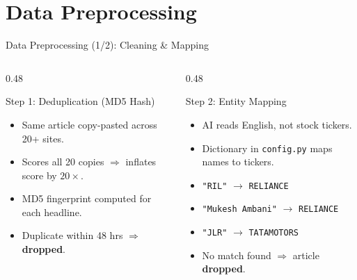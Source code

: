 \documentclass[aspectratio=169, 10pt]{beamer}
\begin{document}
\section{Data Preprocessing}
\begin{frame}{Data Preprocessing (1/2): Cleaning \& Mapping}
    \begin{columns}[T]
        \begin{column}{0.48\textwidth}
            \begin{block}{Step 1: Deduplication (MD5 Hash)}
                \begin{itemize}
                    \item Same article copy-pasted across 20+ sites.
                    \item Scores all 20 copies $\Rightarrow$ inflates score by $20\times$.
                    \item MD5 fingerprint computed for each headline.
                    \item Duplicate within 48 hrs $\Rightarrow$ \textbf{dropped}.
                \end{itemize}
            \end{block}
        \end{column}
        \begin{column}{0.48\textwidth}
            \begin{block}{Step 2: Entity Mapping}
                \begin{itemize}
                    \item AI reads English, not stock tickers.
                    \item Dictionary in \texttt{config.py} maps names to tickers.
                    \item \texttt{"RIL"} $\rightarrow$ \texttt{RELIANCE}
                    \item \texttt{"Mukesh Ambani"} $\rightarrow$ \texttt{RELIANCE}
                    \item \texttt{"JLR"} $\rightarrow$ \texttt{TATAMOTORS}
                    \item No match found $\Rightarrow$ article \textbf{dropped}.
                \end{itemize}
            \end{block}
        \end{column}
    \end{columns}
\end{frame}
\end{document}
